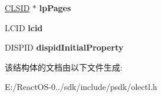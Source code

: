 \begin{DoxyCompactItemize}
\item 
\mbox{\label{structtag_o_c_p_f_i_p_a_r_a_m_s_a322ee693c87071c78d85f747cb3861f8}} 
\hyperlink{struct___i_i_d}{C\+L\+S\+ID} $\ast$ {\bfseries lp\+Pages}
\item 
\mbox{\label{structtag_o_c_p_f_i_p_a_r_a_m_s_a1ea3cb2d24fad1f6a3624c862c30f243}} 
L\+C\+ID {\bfseries lcid}
\item 
\mbox{\label{structtag_o_c_p_f_i_p_a_r_a_m_s_a1da23ac7d052332465be783870d6587f}} 
D\+I\+S\+P\+ID {\bfseries dispid\+Initial\+Property}
\end{DoxyCompactItemize}


该结构体的文档由以下文件生成\+:\begin{DoxyCompactItemize}
\item 
E\+:/\+React\+O\+S-\/0../sdk/include/psdk/olectl.\+h\end{DoxyCompactItemize}
